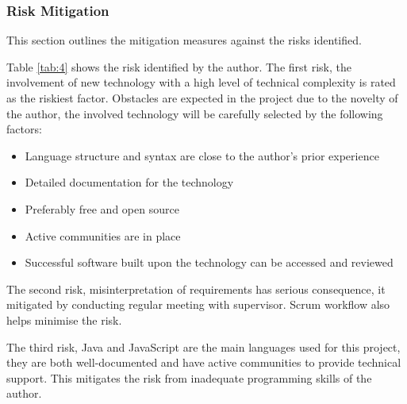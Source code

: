 \documentclass[11pt,a4paper]{article}
\begin{document}
\subsubsection{Risk Mitigation}
This section outlines the mitigation measures against the risks identified.

Table \ref{tab:4} shows the risk identified by the author. The first risk, the involvement of new technology with a high level of technical complexity is rated as the riskiest factor. Obstacles are expected in the project due to the novelty of the author, the involved technology will be carefully selected by the following factors:
\begin{itemize}
	\item Language structure and syntax are close to the author's prior experience  
	\item Detailed documentation for the technology 
	\item Preferably free and open source 
	\item Active communities are in place
	\item Successful software built upon the technology can be accessed and reviewed
\end{itemize}

The second risk, misinterpretation of requirements has serious consequence, it mitigated by conducting regular meeting with supervisor. Scrum workflow also helps minimise the risk.

The third risk, Java and JavaScript are the main languages used for this project, they are both well-documented and have active communities to provide technical support. This mitigates the risk from inadequate programming skills of the author.
\end{document}
